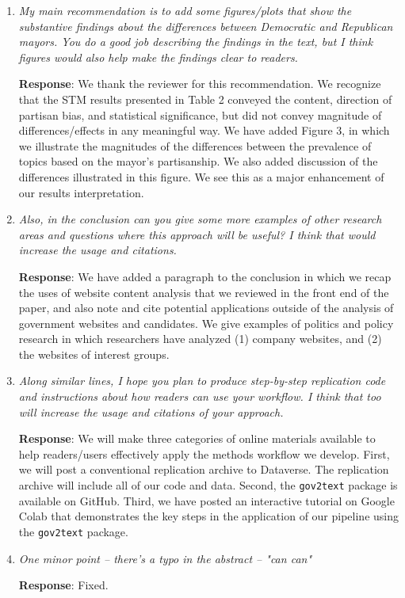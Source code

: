\documentclass[12pt,titlepage]{article}
\begin{document}
\begin{enumerate}


\item \emph{My main recommendation is to add some figures/plots that show the substantive findings about the differences between Democratic and Republican mayors.  You do a good job describing the findings in the text, but I think figures would also help make the findings clear to readers.  } 

	\textbf{Response}: We thank the reviewer for this recommendation. We recognize that the STM results presented in Table 2 conveyed the content, direction of partisan bias, and statistical significance, but did not convey magnitude of differences/effects in any meaningful way. We have added Figure 3, in which we illustrate the magnitudes of the differences between the prevalence of topics based on the mayor's partisanship. We also added discussion of the differences illustrated in this figure. We see this as a major enhancement of our results interpretation.
	
	\item \emph{ Also, in the conclusion can you give some more examples of other research areas and questions where this approach will be useful? I think that would increase the usage and citations.  } 

	\textbf{Response}: We have added a paragraph to the conclusion in which we recap the uses of website content analysis that we reviewed in the front end of the paper, and also note and cite potential applications outside of the analysis of government websites and candidates. We give examples of politics and policy research in which researchers have analyzed (1) company websites, and (2) the websites of interest groups.
	
	\item \emph{ Along similar lines, I hope you plan to produce step-by-step replication code and instructions about how readers can use your workflow.  I think that too will increase the usage and citations of your approach.  } 

	\textbf{Response}: We will make three categories of online materials available to help readers/users effectively apply the methods workflow we develop. First, we will post a conventional replication archive to Dataverse. The replication archive will include all of our code and data. Second, the \texttt{gov2text} package is available on GitHub. Third, we have posted an interactive tutorial on Google Colab that demonstrates the key steps in the application of our pipeline using the \texttt{gov2text} package.

\item \emph{ One minor point -- there's a typo in the abstract -- "can can" } 


\textbf{Response}: Fixed. 


\end{enumerate}
\end{document}
